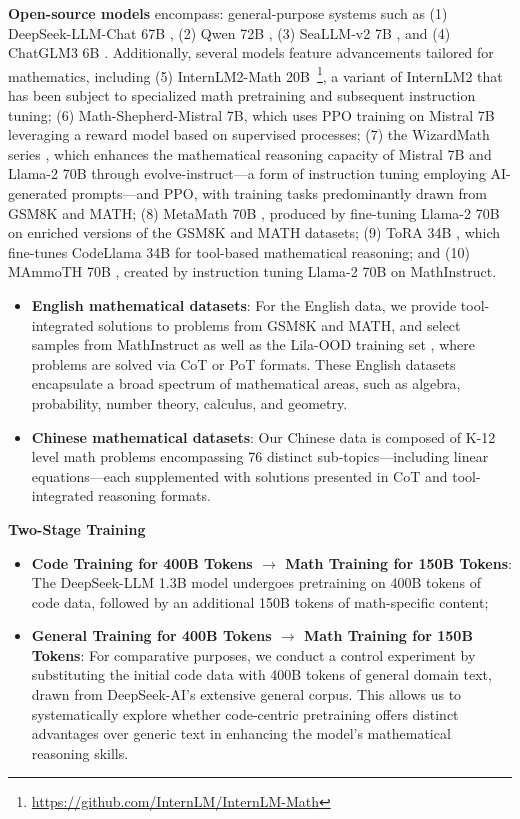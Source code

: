 {\item \textbf{Open-source models} encompass: general-purpose systems such as (1) DeepSeek-LLM-Chat 67B \citep{deepseek-llm}, (2) Qwen 72B \citep{qwen}, (3) SeaLLM-v2 7B \citep{seallm}, and (4) ChatGLM3 6B \citep{chatglm3}. Additionally, several models feature advancements tailored for mathematics, including (5) InternLM2-Math 20B~\footnote{\url{https://github.com/InternLM/InternLM-Math}}, a variant of InternLM2 that has been subject to specialized math pretraining and subsequent instruction tuning; (6) Math-Shepherd-Mistral 7B, which uses PPO training \citep{schulman2017proximal} on Mistral 7B \citep{mistral} leveraging a reward model based on supervised processes; (7) the WizardMath series \citep{wizardmath}, which enhances the mathematical reasoning capacity of Mistral 7B and Llama-2 70B \citep{llama2} through evolve-instruct—a form of instruction tuning employing AI-generated prompts—and PPO, with training tasks predominantly drawn from GSM8K and MATH; (8) MetaMath 70B \citep{metamath}, produced by fine-tuning Llama-2 70B on enriched versions of the GSM8K and MATH datasets; (9) ToRA 34B \cite{tora}, which fine-tunes CodeLlama 34B for tool-based mathematical reasoning; and (10) MAmmoTH 70B \citep{MathInstruct}, created by instruction tuning Llama-2 70B on MathInstruct.

\begin{itemize}[topsep=0pt]
    \item \textbf{English mathematical datasets}: For the English data, we provide tool-integrated solutions to problems from GSM8K and MATH, and select samples from MathInstruct \citep{MathInstruct} as well as the Lila-OOD training set \citep{lila}, where problems are solved via CoT or PoT formats. These English datasets encapsulate a broad spectrum of mathematical areas, such as algebra, probability, number theory, calculus, and geometry.
    \item \textbf{Chinese mathematical datasets}: Our Chinese data is composed of K-12 level math problems encompassing 76 distinct sub-topics—including linear equations—each supplemented with solutions presented in CoT and tool-integrated reasoning formats.
\end{itemize}

\textbf{Two-Stage Training}

\begin{itemize}[topsep=0pt]
    \item \textbf{Code Training for 400B Tokens $\rightarrow$ Math Training for 150B Tokens}: The DeepSeek-LLM 1.3B model undergoes pretraining on 400B tokens of code data, followed by an additional 150B tokens of math-specific content;
    \item \textbf{General Training for 400B Tokens $\rightarrow$ Math Training for 150B Tokens}: For comparative purposes, we conduct a control experiment by substituting the initial code data with 400B tokens of general domain text, drawn from DeepSeek-AI’s extensive general corpus. This allows us to systematically explore whether code-centric pretraining offers distinct advantages over generic text in enhancing the model’s mathematical reasoning skills.
\end{itemize}

}
